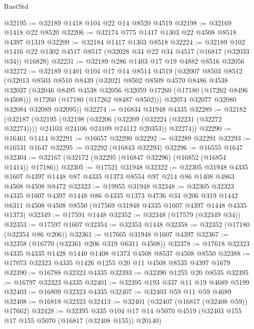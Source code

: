 \begin{lexlean}{RustStd}
\begin{coremodule}
@32195 := @32189 @1418 @104 @22 @14 @8520 @4519
@32198 := @32169 @1418 @22 @8520
@32206 := @32174 @775 @1417 @1303 @22 @4508 @8518 @4397 @1319
@32209 := @32184 @1417 @1303 @8518
@32224 := @32189
    @102
    @1416
    @22
    @1302
    @4517
    @8517
    (@32028 @34 @22 @34 @4517 (@16817 (@32033 @34)) @16828)
@32231 := @32189 @286 @1403 @17 @19 @4882 @8516 @32056
@32272 := @32189
    @1401
    @104
    @17
    @14
    @8514
    @4519
    (@32007
      @8503
      @8512
      (@32013
        @8503
        @8510
        @8439
        (@32021
          @8502
          @8509
          @4570
          @8486
          @4538
          @32037
          (@32046 @8495 @4538 @32056 @32059 @17260 (@17180 (@17262 @8496 @4508)))
          @17260
          (@17180 (@17262 @8487 @8502)))
        @32074
        @32077
        @32080
        @32084
        @32089
        @32095))
@32274 := @16834 @31948 @4335
@32289 := @32182
    (@32187
      (@32195
        (@32198
          (@32206 (@32209 (@32224 (@32231 (@32272 @32274)))) @24103 @24106 @24109 @24112 @20353))
        @32274))
@32290 := @16461 @1414
@32291 := @16657 @32290
@32292 := @32289 @32291
@32293 := @16531 @1647
@32295 := @32292 (@16843 @32293)
@32296 := @16555 @1647
@32304 := @32167 (@32172 (@32295 (@16847 @32296) (@16852 (@16854 @1414)) @17186))
@32305 := @17521 @31948
@32322 := @32305
    @31948
    @4335
    @1607
    @4397
    @1448
    @87
    @4335
    @1373
    @8554
    @97
    @214
    @86
    @1408
    @4863
    @4508
    @4508
    @8472
@32323 := @19955 @31948
@32348 := @32305
    @32323
    @4335
    @1607
    @4397
    @1448
    @86
    @4335
    @1373
    @4736
    @34
    @206
    @319
    @1442
    @6311
    @4508
    @4508
    @8550
    (@17569 @31948 @4335 @1607 @4397 @1448 @4335 @1373)
@32349 := @17591 @1448
@32352 := @32348 (@17579 (@32349 @34))
@32353 := @17597 @1607
@32354 := @32353 @1448
@32358 := @32352 (@17180 (@32354 @86 @206))
@32361 := @17605 @31948 @1607 @4397
@32367 := @32358 (@16770 (@32361 @206 @319 @6311 @4508))
@32378 := @17618 @32323 @4335 @4335 @1428 @1440 @1408 @1373 @4508 @8537 @4508 @8550
@32388 := @17073 @32323 @4335 @1426 @1255 @20 @11 @4508 @8535 @4397 @1679
@32390 := @16788 @32323 @4335
@32393 := @32390 @1255 @20 @8535
@32395 := @16797 @32323 @4335
@32401 := @32395 @193 @337 @11 @19 @4689 @5199
@32403 := @16809 @32323 @4335
@32407 := @32403 @59 @11 @59 @4689
@32408 := @16818 @32323
@32413 := @32401 (@32407 (@16817 (@32408 @59)) @17662)
@32428 := @32395
    @335
    @104
    @17
    @14
    @5070
    @4519
    (@32403 @155 @17 @155 @5070 (@16817 (@32408 @155)) @20140)

\end{coremodule}
\end{lexlean}

